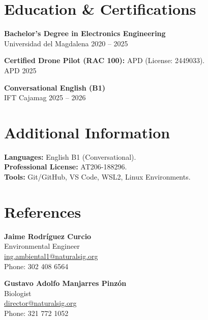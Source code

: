 \documentclass[11pt,a4paper]{article}
\begin{document}
\section*{Education & Certifications}

\textbf{Bachelor’s Degree in Electronics Engineering} \\
Universidad del Magdalena \hfill 2020 -- 2025

\textbf{Certified Drone Pilot (RAC 100):} APD (License: 2449033). \\
APD \hfill 2025

\textbf{Conversational English (B1)} \\
IFT Cajamag \hfill 2025 -- 2026

\section*{Additional Information}

\textbf{Languages:} English B1 (Conversational). \\
\textbf{Professional License:} AT206-188296. \\
\textbf{Tools:} Git/GitHub, VS Code, WSL2, Linux Environments.

\section*{References}

\textbf{Jaime Rodríguez Curcio} \\
Environmental Engineer \\
\href{mailto:ing.ambiental1@naturalsig.org}{ing.ambiental1@naturalsig.org} \\
Phone: 302 408 6564

\vspace{2mm}

\textbf{Gustavo Adolfo Manjarres Pinzón} \\
Biologist \\
\href{mailto:director@naturalsig.org}{director@naturalsig.org} \\
Phone: 321 772 1052
\end{document}
